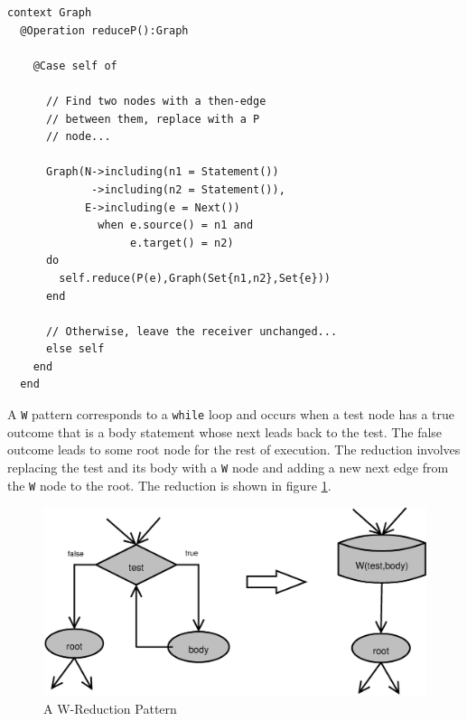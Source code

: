 \documentclass{article}
\begin{document}
\begin{verbatim}
context Graph
  @Operation reduceP():Graph
  
    @Case self of
    
      // Find two nodes with a then-edge
      // between them, replace with a P
      // node...
      
      Graph(N->including(n1 = Statement())
             ->including(n2 = Statement()),
            E->including(e = Next())
              when e.source() = n1 and
                   e.target() = n2)
      do
        self.reduce(P(e),Graph(Set{n1,n2},Set{e}))
      end
      
      // Otherwise, leave the receiver unchanged...
      else self
    end
  end
\end{verbatim}
A {\tt W} pattern corresponds to a {\tt while} loop and occurs when a test 
node has a true outcome that is a body statement
whose next leads back to the test. The false outcome leads to some root node
for the rest of execution. The reduction involves replacing the test and its body
with a {\tt W} node and adding a new next edge from the {\tt W} node to the root.
The reduction is shown in figure \ref{WReduction}.

\begin{figure}
\begin{center}
\includegraphics[scale=0.4]{W}
\end{center}
\caption{A W-Reduction Pattern}
\label{WReduction}
\end{figure}
\end{document}
